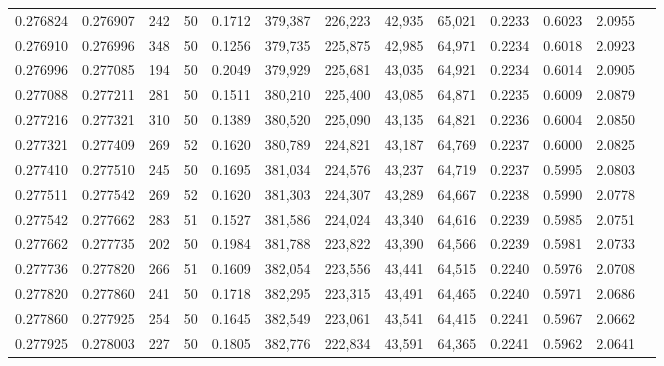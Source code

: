 \begin{tabular}{rrrrrrrrrrrrr}
0.276824 & 0.276907 &   242 &  50 &                                     0.1712 & 379,387 & 226,223 &  42,935 &  65,021 & 0.2233 & 0.6023 & 2.0955 \\
0.276910 & 0.276996 &   348 &  50 &                                     0.1256 & 379,735 & 225,875 &  42,985 &  64,971 & 0.2234 & 0.6018 & 2.0923 \\
0.276996 & 0.277085 &   194 &  50 &                                     0.2049 & 379,929 & 225,681 &  43,035 &  64,921 & 0.2234 & 0.6014 & 2.0905 \\
0.277088 & 0.277211 &   281 &  50 &                                     0.1511 & 380,210 & 225,400 &  43,085 &  64,871 & 0.2235 & 0.6009 & 2.0879 \\
0.277216 & 0.277321 &   310 &  50 &                                     0.1389 & 380,520 & 225,090 &  43,135 &  64,821 & 0.2236 & 0.6004 & 2.0850 \\
0.277321 & 0.277409 &   269 &  52 &                                     0.1620 & 380,789 & 224,821 &  43,187 &  64,769 & 0.2237 & 0.6000 & 2.0825 \\
0.277410 & 0.277510 &   245 &  50 &                                     0.1695 & 381,034 & 224,576 &  43,237 &  64,719 & 0.2237 & 0.5995 & 2.0803 \\
0.277511 & 0.277542 &   269 &  52 &                                     0.1620 & 381,303 & 224,307 &  43,289 &  64,667 & 0.2238 & 0.5990 & 2.0778 \\
0.277542 & 0.277662 &   283 &  51 &                                     0.1527 & 381,586 & 224,024 &  43,340 &  64,616 & 0.2239 & 0.5985 & 2.0751 \\
0.277662 & 0.277735 &   202 &  50 &                                     0.1984 & 381,788 & 223,822 &  43,390 &  64,566 & 0.2239 & 0.5981 & 2.0733 \\
0.277736 & 0.277820 &   266 &  51 &                                     0.1609 & 382,054 & 223,556 &  43,441 &  64,515 & 0.2240 & 0.5976 & 2.0708 \\
0.277820 & 0.277860 &   241 &  50 &                                     0.1718 & 382,295 & 223,315 &  43,491 &  64,465 & 0.2240 & 0.5971 & 2.0686 \\
0.277860 & 0.277925 &   254 &  50 &                                     0.1645 & 382,549 & 223,061 &  43,541 &  64,415 & 0.2241 & 0.5967 & 2.0662 \\
0.277925 & 0.278003 &   227 &  50 &                                     0.1805 & 382,776 & 222,834 &  43,591 &  64,365 & 0.2241 & 0.5962 & 2.0641 \\

\end{tabular}
